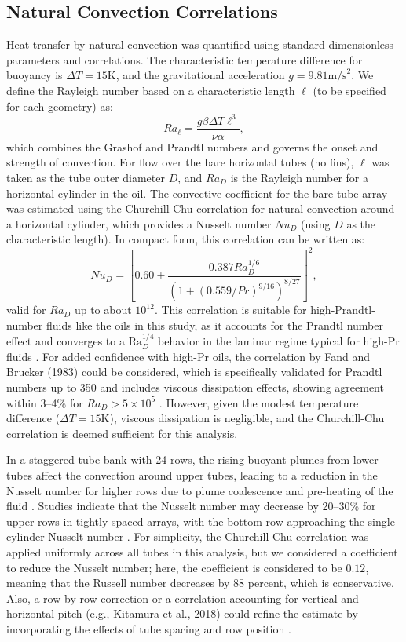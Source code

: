 \documentclass[12pt]{article}
\begin{document}
\subsection{Natural Convection Correlations}
Heat transfer by natural convection was quantified using standard dimensionless parameters and correlations. The characteristic temperature difference for buoyancy is $\Delta T = 15\text{K}$, and the gravitational acceleration $g = 9.81\text{m/s}^2$. We define the Rayleigh number based on a characteristic length $\ell$ (to be specified for each geometry) as:
\begin{equation}
Ra_{\ell} = \frac{g \beta \Delta T \ell^3}{\nu \alpha},
\label{eq:Ra}
\end{equation}
which combines the Grashof and Prandtl numbers and governs the onset and strength of convection. For flow over the bare horizontal tubes (no fins), $\ell$ was taken as the tube outer diameter $D$, and $Ra_D$ is the Rayleigh number for a horizontal cylinder in the oil. The convective coefficient for the bare tube array was estimated using the Churchill-Chu correlation for natural convection around a horizontal cylinder, which provides a Nusselt number $Nu_D$ (using $D$ as the characteristic length). In compact form, this correlation can be written as:
\begin{equation}
Nu_D = \left[0.60 + \frac{0.387 Ra_D^{1/6}}{\left(1 + (0.559/Pr)^{9/16}\right)^{8/27}}\right]^2,
\end{equation}
valid for $Ra_D$ up to about $10^{12}$. This correlation is suitable for high-Prandtl-number fluids like the oils in this study, as it accounts for the Prandtl number effect and converges to a $\text{Ra}_D^{1/4}$ behavior in the laminar regime typical for high-Pr fluids \cite{Fand1983}. For added confidence with high-Pr oils, the correlation by Fand and Brucker (1983) could be considered, which is specifically validated for Prandtl numbers up to 350 and includes viscous dissipation effects, showing agreement within 3–4\% for $Ra_D > 5\times10^5$ \cite{Fand1983}. However, given the modest temperature difference ($\Delta T = 15\text{K}$), viscous dissipation is negligible, and the Churchill-Chu correlation is deemed sufficient for this analysis. 

In a staggered tube bank with 24 rows, the rising buoyant plumes from lower tubes affect the convection around upper tubes, leading to a reduction in the Nusselt number for higher rows due to plume coalescence and pre-heating of the fluid \cite{Kitamura2018}. Studies indicate that the Nusselt number may decrease by 20–30\% for upper rows in tightly spaced arrays, with the bottom row approaching the single-cylinder Nusselt number \cite{Kitamura2018}. For simplicity, the Churchill-Chu correlation was applied uniformly across all tubes in this analysis, but we considered a coefficient to reduce the Nusselt number; here, the coefficient is considered to be $0.12$, meaning that the Russell number decreases by 88 percent, which is conservative. Also, a row-by-row correction or a correlation accounting for vertical and horizontal pitch (e.g., Kitamura et al., 2018) could refine the estimate by incorporating the effects of tube spacing and row position \cite{Kitamura2018}.
\end{document}

